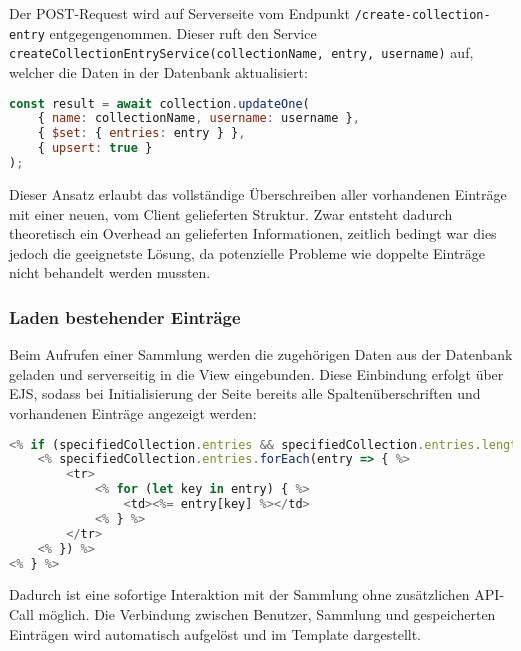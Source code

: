 Der POST-Request wird auf Serverseite vom Endpunkt \texttt{/create-collection-entry} entgegengenommen.
Dieser ruft den Service \texttt{createCollectionEntryService(collectionName, entry, username)} auf, welcher die Daten in der Datenbank aktualisiert:

\begin{lstlisting}[language=JavaScript, caption=Service-Logik zum Überschreiben von Einträgen]
const result = await collection.updateOne(
    { name: collectionName, username: username },
    { $set: { entries: entry } },
    { upsert: true }
);
\end{lstlisting}

Dieser Ansatz erlaubt das vollständige Überschreiben aller vorhandenen Einträge mit einer neuen, vom Client gelieferten Struktur.
Zwar entsteht dadurch theoretisch ein Overhead an gelieferten Informationen, zeitlich bedingt war dies jedoch die geeignetste Lösung, da potenzielle Probleme wie doppelte Einträge nicht behandelt werden mussten.

\subsubsection{Laden bestehender Einträge}

Beim Aufrufen einer Sammlung werden die zugehörigen Daten aus der Datenbank geladen und serverseitig in die View eingebunden.
Diese Einbindung erfolgt über EJS, sodass bei Initialisierung der Seite bereits alle Spaltenüberschriften und vorhandenen Einträge angezeigt werden:

\begin{lstlisting}[language=JavaScript, caption=Darstellung in collections.ejs]
<% if (specifiedCollection.entries && specifiedCollection.entries.length > 0) { %>
    <% specifiedCollection.entries.forEach(entry => { %>
        <tr>
            <% for (let key in entry) { %>
                <td><%= entry[key] %></td>
            <% } %>
        </tr>
    <% }) %>
<% } %>
\end{lstlisting}

Dadurch ist eine sofortige Interaktion mit der Sammlung ohne zusätzlichen API-Call möglich.
Die Verbindung zwischen Benutzer, Sammlung und gespeicherten Einträgen wird automatisch aufgelöst und im Template dargestellt.
